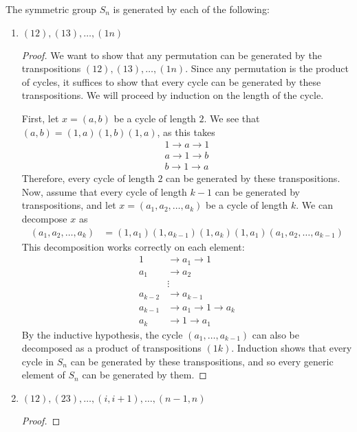 \documentclass[12pt]{article}
\theoremstyle{definition}
\newenvironment{problem}[2][Problem]{\begin{trivlist}
\item[\hskip \labelsep {\bfseries #1}\hskip \labelsep {\bfseries #2.}]}{\end{trivlist}}
\begin{document}
\begin{problem}{12}
The symmetric group $S_n$ is generated by each of the following:
\begin{enumerate}[label=(\alph*)]
    \item $(12),(13), \dots , (1n)$
    \begin{proof}
        We want to show that any permutation can be generated by the transpositions $(12),(13), \dots , (1n)$. Since any permutation is the product of cycles, it suffices to show that every cycle can be generated by these transpositions. We will proceed by induction on the length of the cycle.
        \par First, let $x = (a,b)$ be a cycle of length $2$. We see that $(a,b) = (1,a)(1,b)(1,a)$, as this takes 
        \begin{align*}
            1 \to a \to 1\\
            a \to 1 \to b\\
            b \to 1 \to a
        \end{align*}
        Therefore, every cycle of length $2$ can be generated by these transpositions. Now, assume that every cycle of length $k-1$ can be generated by transpositions, and let $x = (a_1, a_2, \dots , a_k)$ be a cycle of length $k$. We can decompose $x$ as
        \begin{align*}
            (a_1, a_2, \dots, a_k) &= (1,a_1)(1,a_{k-1})(1,a_k)(1,a_1)(a_1,a_2, \dots, a_{k-1})
        \end{align*}
        This decomposition works correctly on each element:
        \begin{align*}
            1 &\to a_1 \to 1\\
            a_1 &\to a_2\\
            &\vdots\\
            a_{k-2} &\to a_{k-1}\\
            a_{k-1} &\to a_1 \to 1 \to a_k\\
            a_k &\to 1 \to a_1
        \end{align*}
        By the inductive hypothesis, the cycle $(a_1, \dots , a_{k-1})$ can also be decomposed as a product of transpositions $(1k)$. Induction shows that every cycle in $S_n$ can be generated by these transpositions, and so every generic element of $S_n$ can be generated by them.
    \end{proof}
    \item $(12), (23), \dots , (i, i + 1), \dots, (n-1, n)$
    \begin{proof}

\end{proof}
\end{enumerate}
\end{problem}
\end{document}
